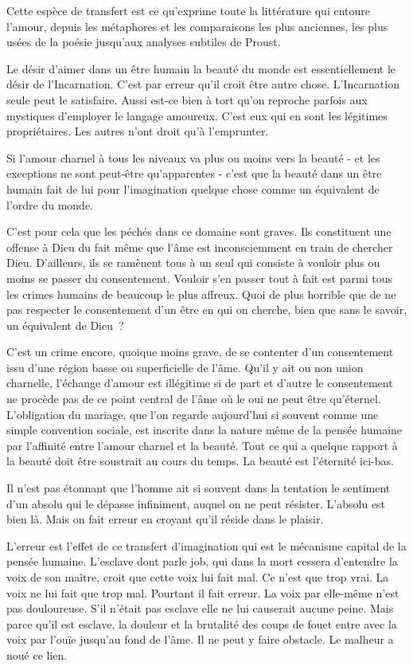 \documentclass[french,twoside]{book} %
\begin{document}
Cette espèce de transfert est ce qu'exprime toute la littérature qui entoure l'amour, depuis les métaphores et les comparaisons les plus anciennes, les plus usées de la poésie jusqu'aux analyses subtiles de Proust.\par
Le désir d'aimer dans un être humain la beauté du monde est essentiellement le désir de l'Incarnation. C'est par erreur qu'il croit être autre chose. L'Incarnation seule peut le satisfaire. Aussi est-ce bien à tort qu'on reproche parfois aux mystiques d'employer le langage amoureux. C'est eux qui en sont les légitimes propriétaires. Les autres n'ont droit qu'à l'emprunter.\par
Si l'amour charnel à tous les niveaux va plus ou moins vers la beauté - et les exceptions ne sont peut-être qu'apparentes - c'est que la beauté dans un être humain fait de lui pour l'imagination quelque chose comme un équivalent de l'ordre du monde.\par
C'est pour cela que les péchés dans ce domaine sont graves. Ils constituent une offense à Dieu du fait même que l'âme est inconsciemment en train de chercher Dieu. D'ailleurs, ils se ramènent tous à un seul qui consiste à vouloir plus ou moins se passer du consentement. Vouloir s'en passer tout à fait est parmi tous les crimes humains de beaucoup le plus affreux. Quoi de plus horrible que de ne pas respecter le consentement d'un être en qui on cherche, bien que sans le savoir, un équivalent de Dieu ?\par
C'est un crime encore, quoique moins grave, de se contenter d'un consentement issu d'une région basse ou superficielle de l'âme. Qu'il y ait ou non union charnelle, l'échange d'amour est illégitime si de part et d'autre le consentement ne procède pas de ce point central de l'âme où le oui ne peut être qu'éternel. L'obligation du mariage, que l'on regarde aujourd'hui si souvent comme une simple convention sociale, est inscrite dans la nature même de la pensée humaine par l'affinité entre l'amour charnel et la beauté. Tout ce qui a quelque rapport à la beauté doit être soustrait au cours du temps. La beauté est l'éternité ici-bas.\par
Il n'est pas étonnant que l'homme ait si souvent dans la tentation le sentiment d'un absolu qui le dépasse infiniment, auquel on ne peut résister. L'absolu est bien là. Mais on fait erreur en croyant qu'il réside dans le plaisir.\par
L'erreur est l'effet de ce transfert d'imagination qui est le mécanisme capital de la pensée humaine. L'esclave dont parle job, qui dans la mort cessera d'entendre la voix de son maître, croit que cette voix lui fait mal. Ce n'est que trop vrai. La voix ne lui fait que trop mal. Pourtant il fait erreur. La voix par elle-même n'est pas douloureuse. S'il n'était pas esclave elle ne lui causerait aucune peine. Mais parce qu'il est esclave, la douleur et la brutalité des coups de fouet entre avec la voix par l'ouïe jusqu'au fond de l'âme. Il ne peut y faire obstacle. Le malheur a noué ce lien.\par
\end{document}
